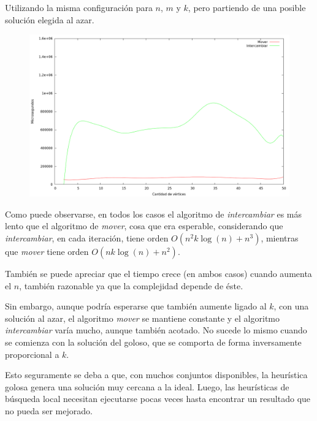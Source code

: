 \vspace*{0.5cm}


Utilizando la misma configuración para $n$, $m$ y $k$, pero partiendo de una
posible solución elegida al azar.

\vspace*{0.5cm}

\begin{figure}[H]
  \begin{center}
    \includegraphics[scale=0.35]{imagenes/local-random-k-tiempo.png}
  \end{center}
\end{figure}

\vspace*{0.75cm}


Como puede observarse, en todos los casos el algoritmo de \textit{intercambiar}
es más lento que el algoritmo de \textit{mover}, cosa que era esperable,
considerando que \textit{intercambiar}, en cada iteración, tiene orden
$O(n^2k\log(n) + n^3)$, mientras que \textit{mover} tiene orden $O(nk\log(n) +
n^2)$.

También se puede apreciar que el tiempo crece (en ambos casos) cuando aumenta
el $n$, también razonable ya que la complejidad depende de éste.

Sin embargo, aunque podría esperarse que también aumente ligado al $k$, con una
solución al azar, el algoritmo \textit{mover} se mantiene constante y el
algoritmo \textit{intercambiar} varía mucho, aunque también acotado. No sucede
lo mismo cuando se comienza con la solución del goloso, que se comporta
de forma inversamente proporcional a $k$.

Esto seguramente se deba a que, con muchos conjuntos disponibles, la heurística golosa genera una solución muy cercana a la ideal. Luego, las heurísticas de búsqueda local necesitan ejecutarse pocas veces hasta encontrar un resultado que no pueda ser mejorado.


